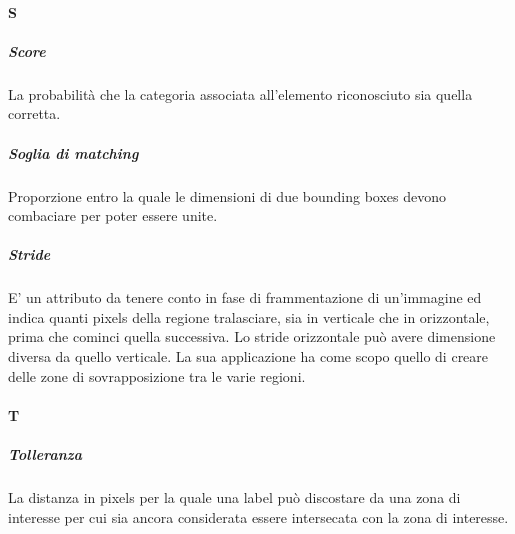 \paragraph{S}
\subparagraph{Score} La probabilità che la categoria associata all'elemento riconosciuto sia quella corretta.
\subparagraph{Soglia di matching}
Proporzione entro la quale le dimensioni di due bounding boxes devono combaciare per poter essere unite.
\subparagraph{Stride} E' un attributo da tenere conto in fase di frammentazione di un'immagine ed indica quanti pixels della regione tralasciare, sia in verticale che in orizzontale, prima che cominci quella successiva. Lo stride orizzontale può avere dimensione diversa da quello verticale. La sua applicazione ha come scopo quello di creare delle zone di sovrapposizione tra le varie regioni.

\paragraph{T}
\subparagraph{Tolleranza} La distanza in pixels per la quale una label può discostare da una zona di interesse per cui sia ancora considerata essere intersecata con la zona di interesse.
